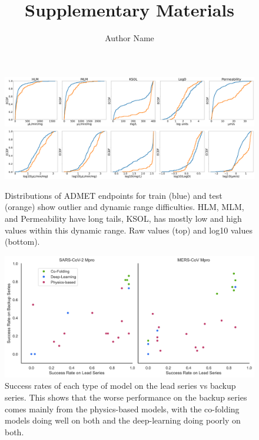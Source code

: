 \documentclass{article}
\title{Supplementary Materials}
\author{Author Name}
\begin{document}
\maketitle

\begin{figure}
    \includegraphics[scale=0.175]{04_figs_leaderboards/admet_endpoints.png}
    \includegraphics[scale=0.175]{04_figs_leaderboards/admet_endpoints_log10.png}
  \caption{Distributions of ADMET endpoints for train (blue) and test (orange) show outlier and dynamic range difficulties.  HLM, MLM, and Permeability have long tails, KSOL, has mostly low and high values within this dynamic range.  Raw values (top) and log10 values (bottom).}
  \label{fgr:admet_endpoints}
\end{figure}

\begin{figure}
    \includegraphics[scale=0.75]{04_figs_leaderboards/success_rate_lead_vs_backup_comparison.png}
  \caption{Success rates of each type of model on the lead series vs backup series. This shows that the worse performance on the backup series comes mainly from the physics-based models, with the co-folding models doing well on both and the deep-learning doing poorly on both.}
  \label{fgr:success_rate_lead_vs_backup}
\end{figure}
\end{document}
